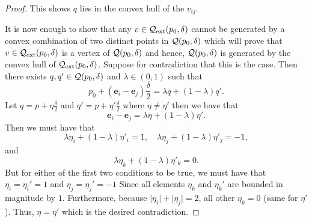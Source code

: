 \begin{proof}
This shows $q$ lies in the convex hull of the $v_{ij}$.


It is now enough to show that any $v \in \mathcal{Q}_{\mathrm{ext}}(p_0,\delta)$ cannot be generated by a convex combination of two distinct points in $\mathcal{Q}(p_0,\delta)$ which will prove that $v \in \mathcal{Q}_{\mathrm{ext}}(p_0,\delta)$ is a vertex of $\mathcal{Q}(p_0,\delta)$ and hence, $\mathcal{Q}(p_0,\delta)$ is generated by the convex hull of $\mathcal{Q}_{\mathrm{ext}}(p_0,\delta)$. Suppose for contradiction that this is the case. Then there exists $q,q'\in\mathcal{Q}(p_0,\delta)$ and $\lambda \in (0,1)$ such that 
$$p_0 + (\mathbf{e}_i-\mathbf{e}_j)\frac{\delta}{2} = \lambda q + (1-\lambda)q'.$$
Let $q = p + \eta\frac{\delta}{2}$ and $q' = p + \eta'\frac{\delta}{2}$ where $\eta \neq \eta'$ then we have that 
$$\mathbf{e}_i - \mathbf{e}_j = \lambda \eta + (1-\lambda)\eta'.$$
Then we must have that 
$$\lambda \eta_i + (1-\lambda)\eta'_i = 1, \quad \lambda \eta_{j}+(1-\lambda)\eta'_j = -1,$$
and
$$\lambda \eta_{k} + (1-\lambda)\eta'_k  = 0.$$
But for either of the first two conditions to be true, we must have that $\eta_i = \eta_i' = 1$ and $\eta_j = \eta_j' = -1$ Since all elements $\eta_k$ and $\eta_k'$ are bounded in magnitude by $1$. Furthermore, because $\lvert \eta_i\rvert + \lvert \eta_j\rvert = 2$, all other $\eta_k = 0$ (same for $\eta'$). Thus, $\eta = \eta'$ which is the desired contradiction.
\end{proof}
